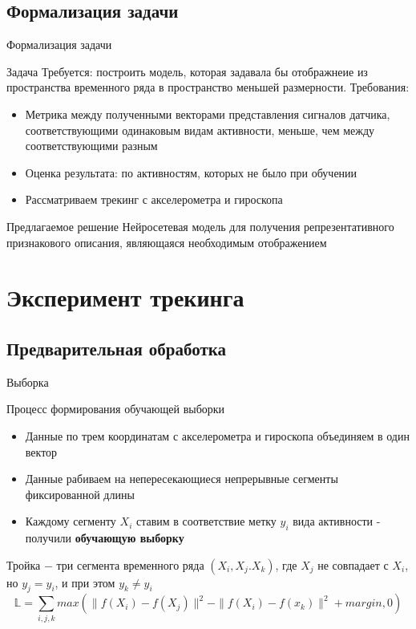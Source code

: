 \documentclass[unicode]{beamer}
\begin{document}
\subsection{Формализация задачи}
\begin{frame}{Формализация задачи}
    \begin{block}{Задача}
    \footnotesize
        Требуется: построить модель, которая задавала бы отображнеие из пространства временного ряда в пространство меньшей размерности. Требования:
        \begin{itemize}
            \item Метрика между полученными векторами представления сигналов датчика, соответствующими одинаковым видам активности, меньше, чем между соответствующими разным
            \item Оценка результата: по активностям, которых не было при обучении
            \item Рассматриваем трекинг с акселерометра и гироскопа
        \end{itemize}
    \end{block}

    \begin{block}{Предлагаемое решение}
    \footnotesize
        Нейросетевая модель для получения репрезентативного признакового описания, являющаяся необходимым отображением
    \end{block}
\end{frame}


\section{Эксперимент трекинга}
\subsection{Предварительная обработка}
\begin{frame}{Выборка}
    \begin{block}{Процесс формирования обучающей выборки}
        \begin{itemize}
            \item Данные по трем координатам с акселерометра и гироскопа объединяем в один вектор
            \item Данные рабиваем на непересекающиеся непрерывные сегменты фиксированной длины
            \item Каждому сегменту $X_i$ ставим в соответствие метку $y_i$ вида активности - получили \textbf{обучающую выборку}
        \end{itemize}
    \end{block}
        \begin{block}{}
            Тройка $-$ три сегмента временного ряда $(X_i, X_j. X_k)$, где $X_j$ не совпадает с $X_i$, но $y_j = y_i$, и при этом $y_k \neq y_i$
            $$\mathbb{L} = \sum\limits_{i, j, k}max(\|f(X_i) - f(X_j)\|^2 - \|f(X_i) - f(x_k)\|^2 + margin, 0)$$
    \end{block}
\end{frame}
\end{document}
